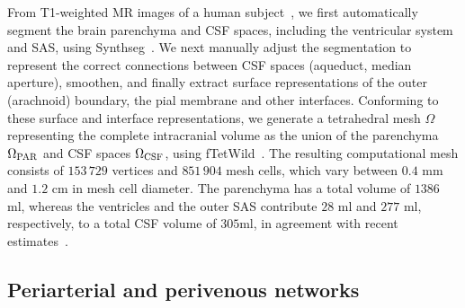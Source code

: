 \documentclass[fleqn,10pt]{wlscirep}
\begin{document}
From T1-weighted MR images of a human subject~\cite{hodneland2019new},
we first automatically segment the brain parenchyma and CSF spaces,
including the ventricular system and SAS, using
Synthseg~\cite{billot2023robust,billot2023synthseg}. We next manually
adjust the segmentation to represent the correct connections between
CSF spaces (aqueduct, median aperture), smoothen, and finally extract
surface representations of the outer (arachnoid) boundary, the pial
membrane and other interfaces. Conforming to these surface and
interface representations, we generate a tetrahedral mesh $\Omega$
representing the complete intracranial volume as the union of the
parenchyma $\Omega_{\rm PAR}$ and CSF spaces $\Omega_{\rm CSF}$, using
fTetWild~\cite{hu2020fast}. The resulting computational mesh consists
of $153\,729$ vertices and $851\,904$ mesh cells, which vary between
$0.4$ mm and $1.2$ cm in mesh cell diameter. The parenchyma has a
total volume of $1386$ ml, whereas the ventricles and the outer SAS
contribute $28$ ml and $277$ ml, respectively, to a total CSF volume
of $305$ml, in agreement with recent
estimates~\cite{hladky2024regulation}.



\subsection*{Periarterial and perivenous networks}
\end{document}
